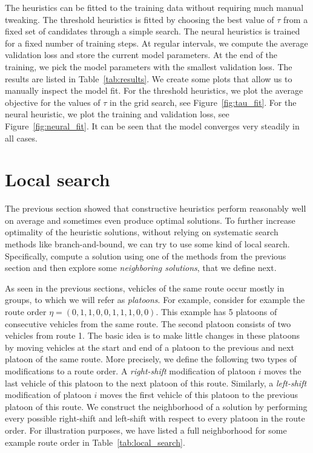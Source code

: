 \documentclass[a4paper]{article}
\theoremstyle{definition}
\theoremstyle{plain}
\begin{document}
The heuristics can be fitted to the training data without requiring much manual tweaking.
%
The threshold heuristics is fitted by choosing the best value of $\tau$ from a
fixed set of candidates through a simple search. The neural heuristics is
trained for a fixed number of training steps. At regular intervals, we compute
the average validation loss and store the current model parameters. At the end
of the training, we pick the model parameters with the smallest validation loss.
The results are listed in Table~\ref{tab:results}.
%
We create some plots that allow us to manually inspect the model fit.
For the threshold heuristics, we plot the average objective for the values of
$\tau$ in the grid search, see Figure~\ref{fig:tau_fit}.
%
For the neural heuristic, we plot the training and validation loss, see
Figure~\ref{fig:neural_fit}. It can be seen that the model converges very steadily in all cases.



\section{Local search}

The previous section showed that constructive heuristics perform reasonably well
on average and sometimes even produce optimal solutions. To further increase
optimality of the heuristic solutions, without relying on systematic search
methods like branch-and-bound, we can try to use some kind of local search.
Specifically, compute a solution using one of the methods from the previous
section and then explore some \textit{neighboring solutions}, that we define next.

As seen in the previous sections, vehicles of the same route occur mostly in
groups, to which we will refer as \textit{platoons}. For example, consider for example
the route order $\eta = (0, 1, 1, 0, 0, 1, 1, 1, 0, 0)$. This example has 5
platoons of consecutive vehicles from the same route. The second platoon
consists of two vehicles from route 1.
The basic idea is to make little changes in these platoons by moving vehicles at
the start and end of a platoon to the previous and next platoon of the same
route.
%
More precisely, we define the following two types of modifications to a route
order. A \textit{right-shift} modification of platoon $i$ moves the last vehicle of this
platoon to the next platoon of this route. Similarly, a \textit{left-shift} modification
of platoon $i$ moves the first vehicle of this platoon to the previous platoon
of this route.
%
We construct the neighborhood of a solution by performing every possible
right-shift and left-shift with respect to every platoon in the route order. For
illustration purposes, we have listed a full neighborhood for some example route
order in Table~\ref{tab:local_search}.
\end{document}
